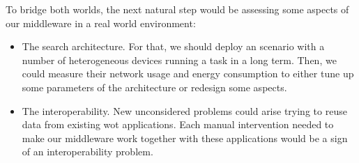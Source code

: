To bridge both worlds, the next natural step would be assessing some aspects of our middleware in a real world environment: %
\begin{itemize}
  \item The search architecture.
        For that, we should deploy an scenario with a number of heterogeneous devices running a task in a long term.
        Then, we could measure their network usage and energy consumption to either tune up some parameters of the architecture or redesign some aspects.
  \item The interoperability.
	New unconsidered problems could arise trying to reuse data from existing \ac{wot} applications.
	Each manual intervention needed to make our middleware work together with these applications would be a sign of an interoperability problem.
\end{itemize}